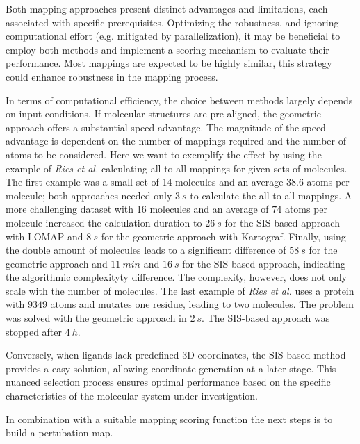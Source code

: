 \documentclass[9pt,bestpractices,pubversion]{livecoms}
\begin{document}
Both mapping approaches present distinct advantages and limitations, each associated with specific prerequisites. Optimizing the robustness, and ignoring computational effort (e.g. mitigated by parallelization), it may be beneficial to employ both methods and implement a scoring mechanism to evaluate their performance. Most mappings are expected to be highly similar, this strategy could enhance robustness in the mapping process.

In terms of computational efficiency, the choice between methods largely depends on input conditions. If molecular structures are pre-aligned, the geometric approach offers a substantial speed advantage. The magnitude of the speed advantage is dependent on the number of mappings required and the number of atoms to be considered. Here we want to exemplify the effect by using the example of \textit{Ries et al.} calculating all to all mappings for given sets of molecules. The first example was a small set of 14 molecules and an average $38.6$ atoms per molecule; both approaches needed only $3~s$ to calculate the all to all mappings. A more challenging dataset with 16 molecules and an average of $74$ atoms per molecule increased the calculation duration to $26~s$ for the SIS based approach with LOMAP and $8~s$ for the geometric approach with Kartograf. Finally, using the double amount of molecules leads to a significant difference of $58~s$ for the geometric approach and $11~min$ and $16~s$ for the SIS based approach, indicating the algorithmic complexityty difference. The complexity, however, does not only scale with the number of molecules. The last example of \textit{Ries et al.} uses a protein with $9349$ atoms and mutates one residue, leading to two molecules. The problem was solved with the geometric approach in $2~s$. The SIS-based approach was stopped after $4~h$. \cite{ries2024kartograf}

Conversely, when ligands lack predefined 3D coordinates, the SIS-based method provides a easy solution, allowing coordinate generation at a later stage. This nuanced selection process ensures optimal performance based on the specific characteristics of the molecular system under investigation.

In combination with a suitable mapping scoring function the next steps is to build a pertubation map.
\end{document}
